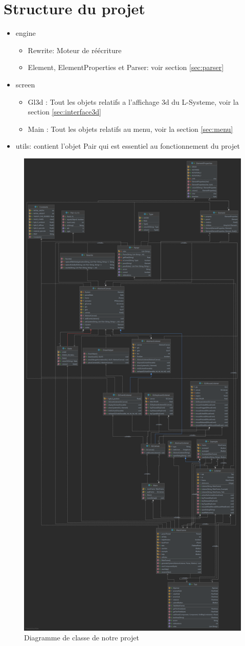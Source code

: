 \section{Structure du projet}
\begin{itemize}
    \item engine
    \begin{itemize}
        \item Rewrite: Moteur de réécriture
        \item Element, ElementProperties et Parser: voir section \ref{sec:parser}
    \end{itemize}
    \item screen
    \begin{itemize}
        \item Gl3d : Tout les objets relatifs a l'affichage 3d du L-Systeme, voir la section \ref{sec:interface3d}
        \item Main : Tout les objets relatifs au menu, voir la section \ref{sec:menu}
    \end{itemize}
    \item utils: contient l'objet Pair qui est essentiel au fonctionnement du projet
\end{itemize}

\begin{figure}[ht]
    \centering
    \includegraphics[width=0.7\linewidth]{pics/diagram.png}
    \caption{Diagramme de classe de notre projet}
    \label{fig:class_diagram}
\end{figure}

